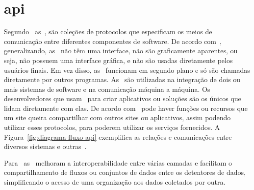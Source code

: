 \section{\acrlong{api}}\label{sec:api}

Segundo~\textcite{borgogno2019} as~,
são coleções de protocolos que especificam os meios de comunicação
entre diferentes componentes de software.
De acordo com~\textcite{biehl2015}, generalizando, as~ não
têm uma interface, não são graficamente aparentes, ou seja, não possuem uma
interface gráfica, e não são usadas diretamente pelos usuários finais.
Em vez disso, as~ funcionam em segundo plano e só são chamadas
diretamente por outros programas.
As~ são utilizadas na integração de dois ou mais sistemas de
software e na comunicação máquina a máquina.
Os desenvolvedores que usam~ para criar aplicativos ou
soluções são os únicos que lidam diretamente com elas.
De acordo com~\textcite{russel2019} pode haver funções ou recursos que um
site queira compartilhar com outros sites ou aplicativos, assim podendo
utilizar esses protocolos, para poderem utilizar os serviços fornecidos.
A Figura~\ref{fig:diagrama-fluxo-api} exemplifica as relações e
comunicações entre diversos sistemas e outras~.

Para~\textcite{borgogno2019} as~ melhoram a
interoperabilidade entre várias camadas e facilitam o compartilhamento de
fluxos ou conjuntos de dados entre os detentores de dados, simplificando o
acesso de uma organização aos dados coletados por outra.

